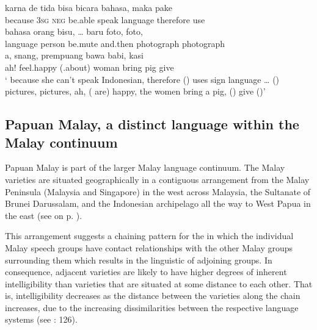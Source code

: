 \ea
\label{Example_1.2}
\gll {\ldots} karna de tida bisa bicara bahasa, maka  pake\\ %
 { } because \textsc{3sg} \textsc{neg} be.able speak language therefore {} use\\
\gll bahasa orang bisu, {\ldots} baru    foto, foto,\\
language person be.mute {} and.then { } { } photograph photograph\\
\gll a,  snang, prempuang bawa babi,   kasi  \\
ah! { } {feel.happy (.about)} woman bring pig { } give \\
\glt
{} ` because she can’t speak Indonesian, therefore () uses sign language {\ldots} () pictures, pictures, ah, ( are) happy, the women bring a pig, () give ()’ \textstyleExampleSource{[081006-023-CvEx.0073]}
\z



\subsection{Papuan Malay, a distinct language within the Malay continuum}\label{Para_1.2.3}
Papuan Malay is part of the larger Malay language continuum. The Malay varieties are situated geographically in a contiguous arrangement from the Malay Peninsula (Malay\-sia and Singapore) in the west across Malaysia, the Sultanate of Brunei Darussalam, and the Indonesian archipelago all the way to West Papua in the east (see  on p. \pageref{Figure_0.1}).


This arrangement suggests a chaining pattern for the  in which the individual Malay speech groups have contact relationships with the other Malay groups surrounding them which results in the linguistic  of adjoining groups. In consequence, adjacent varieties are likely to have higher degrees of inherent intelligibility than varieties that are situated at some distance to each other. That is, intelligibility decreases as the distance between the varieties along the chain increases, due to the increasing dissimilarities between the respective language systems (see \citealt{Karam.2000}: 126).



